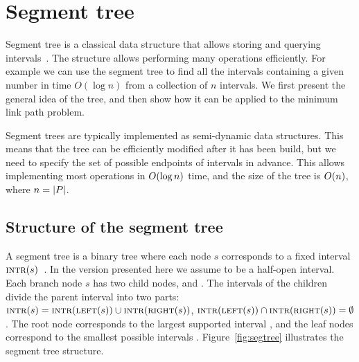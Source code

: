\documentclass[english,gradu]{tktltiki2018}
\begin{document}
\section{Segment tree}\label{sec:segtree}

Segment tree is a classical data structure that allows storing and querying intervals~\cite{berg2008,wagner}.
The structure allows performing many operations efficiently.
For example we can use the segment tree to find all the intervals containing a given number in time $O(\log n)$ from a collection of $n$ intervals.
We first present the general idea of the tree, and then show how it can be applied to the minimum link path problem.

Segment trees are typically implemented as semi-dynamic data structures.
This means that the tree can be efficiently modified after it has been build, but we need to specify the set of possible endpoints \epts of intervals in advance.
This allows implementing most operations in $O(\log n)$ time, and the size of the tree is $O(n)$, where $n=\left |P\right |$.

\subsection{Structure of the segment tree}

A segment tree is a binary tree where each node $s$ corresponds to a fixed interval $\textsc{intr}(s)$~\cite{berg2008}.
In the version presented here we assume  to be a half-open interval.
Each branch node $s$ has two child nodes,  and .
The intervals of the children divide the parent interval into two parts:
$\textsc{intr}(s)=\textsc{intr}(\textsc{left}(s))\cup\textsc{intr}(\textsc{right}(s))$, $\textsc{intr}(\textsc{left}(s))\cap\textsc{intr}(\textsc{right}(s))=\emptyset$.
The root node corresponds to the largest supported interval \range{\epts[1]}{\epts[\segsize]}, and the leaf nodes correspond to the smallest possible intervals \range{\epts[i]}{\epts[i+1]}.
Figure~\ref{fig:segtree} illustrates the segment tree structure.
\end{document}
